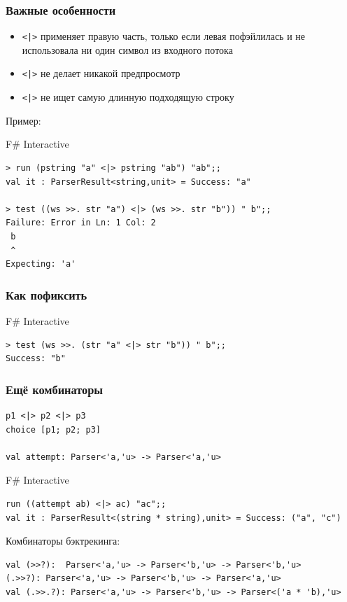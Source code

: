 \documentclass[xetex,mathserif,serif]{beamer}
\begin{document}
    \begin{frame}[fragile]
        \frametitle{Важные особенности}
        \begin{small}
            \begin{itemize}
                \item \verb!<|>! применяет правую часть, только если левая пофэйлилась и не использовала ни один символ из входного потока
                \item \verb!<|>! не делает никакой предпросмотр
                \item \verb!<|>! не ищет самую длинную подходящую строку
            \end{itemize}
            Пример:
            \begin{alertblock}{F\# Interactive}
                \begin{verbatim}
> run (pstring "a" <|> pstring "ab") "ab";;
val it : ParserResult<string,unit> = Success: "a"

> test ((ws >>. str "a") <|> (ws >>. str "b")) " b";;
Failure: Error in Ln: 1 Col: 2
 b
 ^
Expecting: 'a'
                \end{verbatim}
            \end{alertblock}
        \end{small}
    \end{frame}

    \begin{frame}[fragile]
        \frametitle{Как пофиксить}
        \begin{alertblock}{F\# Interactive}
            \begin{verbatim}
> test (ws >>. (str "a" <|> str "b")) " b";;
Success: "b"
            \end{verbatim}
        \end{alertblock}
    \end{frame}

    \begin{frame}[fragile]
        \frametitle{Ещё комбинаторы}
        \begin{verbatim}
p1 <|> p2 <|> p3
choice [p1; p2; p3]

val attempt: Parser<'a,'u> -> Parser<'a,'u>
        \end{verbatim}
        \begin{alertblock}{F\# Interactive}
            \begin{verbatim}
run ((attempt ab) <|> ac) "ac";;
val it : ParserResult<(string * string),unit> = Success: ("a", "c")
            \end{verbatim}
        \end{alertblock}
        Комбинаторы бэктрекинга:
        \begin{verbatim}
val (>>?):  Parser<'a,'u> -> Parser<'b,'u> -> Parser<'b,'u>
(.>>?): Parser<'a,'u> -> Parser<'b,'u> -> Parser<'a,'u>
val (.>>.?): Parser<'a,'u> -> Parser<'b,'u> -> Parser<('a * 'b),'u>
        \end{verbatim}
    \end{frame}
\end{document}

